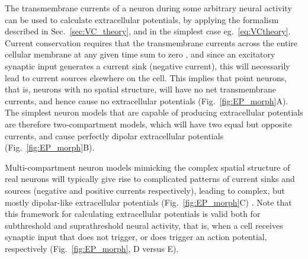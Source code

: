\documentclass[preprint,11pt,authoryear]{elsarticle}
\newcommand{\hlb}[2][blue]{ {\sethlcolor{#1} \hl{#2}} }
\newcommand{\ghnote}[1]{\color{white}{\hlb{GH: #1 }}\color{black}}
\begin{document}


The transmembrane currents of a neuron during some arbitrary neural activity can be used to calculate extracellular potentials, by applying the formalism described in Sec.~\ref{sec:VC_theory}, and in the simplest case eg.~\ref{eq:VCtheory}.
Current conservation requires that the transmembrane currents across the entire cellular membrane at any given time sum to zero \citep{Koch1999, Nunez2006}, and since
an excitatory synaptic input generates a current sink (negative current), this will necessarily lead to current sources elsewhere on the cell. This implies that point neurons, that is, neurons with no spatial structure, will have no net transmembrane currents, and hence cause no extracellular potentials (Fig.~\ref{fig:EP_morph}A). The simplest neuron models that are capable of producing extracellular potentials are therefore two-compartment models, which will have two equal but opposite currents, and cause perfectly dipolar extracellular potentials (Fig.~\ref{fig:EP_morph}B).

Multi-compartment neuron models mimicking the complex spatial structure of real neurons will typically give rise to complicated patterns of current sinks and sources (negative and positive currents respectively), leading to complex, but mostly dipolar-like extracellular potentials (Fig.~\ref{fig:EP_morph}C) \citep{Einevoll2013}.
Note that this framework for calculating extracellular potentials is valid both for subthreshold and suprathreshold neural activity, that is, when a cell receives synaptic input that does not trigger, or does trigger an action potential, respectively (Fig.~\ref{fig:EP_morph}, D versus E).
\end{document}
